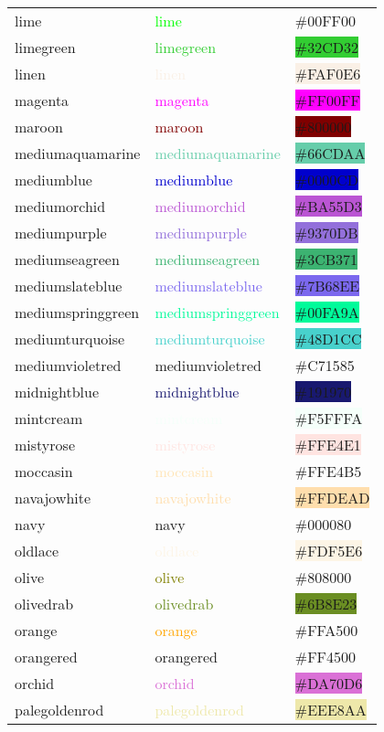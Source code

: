 \documentclass[
]{article}
\begin{document}
\begin{longtable}[]{@{}lll@{}}
lime & \textcolor{lime}{lime} &
\colorbox{electricgreen}{\#00FF00}\tabularnewline
limegreen & \textcolor{limegreen}{limegreen} &
\colorbox{limegreen}{\#32CD32}\tabularnewline
linen & \textcolor{linen}{linen} &
\colorbox{linen}{\#FAF0E6}\tabularnewline
magenta & \textcolor{magenta}{magenta} &
\colorbox{fuchsia}{\#FF00FF}\tabularnewline
maroon & \textcolor{maroon}{maroon} &
\colorbox{maroon}{\#800000}\tabularnewline
mediumaquamarine & \textcolor{mediumaquamarine}{mediumaquamarine} &
\colorbox{mediumaquamarine}{\#66CDAA}\tabularnewline
mediumblue & \textcolor{mediumblue}{mediumblue} &
\colorbox{mediumblue}{\#0000CD}\tabularnewline
mediumorchid & \textcolor{mediumorchid}{mediumorchid} &
\colorbox{mediumorchid}{\#BA55D3}\tabularnewline
mediumpurple & \textcolor{mediumpurple}{mediumpurple} &
\colorbox{mediumpurple}{\#9370DB}\tabularnewline
mediumseagreen & \textcolor{mediumseagreen}{mediumseagreen} &
\colorbox{mediumseagreen}{\#3CB371}\tabularnewline
mediumslateblue & \textcolor{mediumslateblue}{mediumslateblue} &
\colorbox{mediumslateblue}{\#7B68EE}\tabularnewline
mediumspringgreen & \textcolor{mediumspringgreen}{mediumspringgreen} &
\colorbox{mediumspringgreen}{\#00FA9A}\tabularnewline
mediumturquoise & \textcolor{mediumturquoise}{mediumturquoise} &
\colorbox{mediumturquoise}{\#48D1CC}\tabularnewline
mediumvioletred & \textcolor{mediumviolet-red}{mediumvioletred} &
\colorbox{mediumviolet-red}{\#C71585}\tabularnewline
midnightblue & \textcolor{midnightblue}{midnightblue} &
\colorbox{midnightblue}{\#191970}\tabularnewline
mintcream & \textcolor{mintcream}{mintcream} &
\colorbox{mintcream}{\#F5FFFA}\tabularnewline
mistyrose & \textcolor{mistyrose}{mistyrose} &
\colorbox{mistyrose}{\#FFE4E1}\tabularnewline
moccasin & \textcolor{moccasin}{moccasin} &
\colorbox{peach}{\#FFE4B5}\tabularnewline
navajowhite & \textcolor{navajowhite}{navajowhite} &
\colorbox{navajowhite}{\#FFDEAD}\tabularnewline
navy & \textcolor{navyblue}{navy} &
\colorbox{navyblue}{\#000080}\tabularnewline
oldlace & \textcolor{oldlace}{oldlace} &
\colorbox{oldlace}{\#FDF5E6}\tabularnewline
olive & \textcolor{olive}{olive} &
\colorbox{heartgold}{\#808000}\tabularnewline
olivedrab & \textcolor{olivedrab}{olivedrab} &
\colorbox{olivedrab}{\#6B8E23}\tabularnewline
orange & \textcolor{orange}{orange} &
\colorbox{chromeyellow}{\#FFA500}\tabularnewline
orangered & \textcolor{orange-red}{orangered} &
\colorbox{orange-red}{\#FF4500}\tabularnewline
orchid & \textcolor{orchid}{orchid} &
\colorbox{orchid}{\#DA70D6}\tabularnewline
palegoldenrod & \textcolor{palegoldenrod}{palegoldenrod} &
\colorbox{palegoldenrod}{\#EEE8AA}\tabularnewline

\end{longtable}
\end{document}
